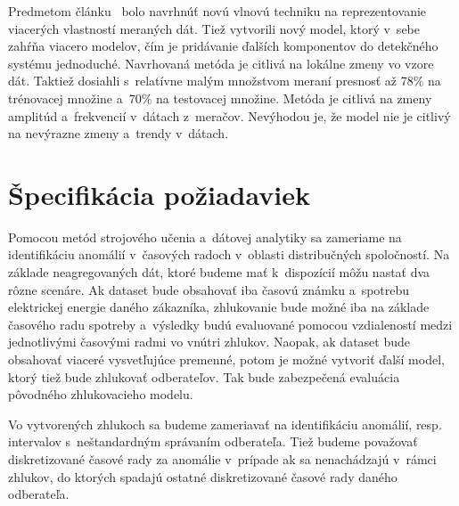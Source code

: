 \documentclass[a4paper,twoside,slovak,12pt,appendix]{article}
\begin{document}
Predmetom článku~\cite{Tagaris2002} bolo navrhnúť novú vlnovú techniku na
reprezentovanie viacerých vlastností meraných dát. Tiež vytvorili nový model,
ktorý v~sebe zahŕňa viacero modelov, čím je pridávanie ďalších komponentov do
detekčného systému jednoduché. Navrhovaná metóda je citlivá na lokálne zmeny vo
vzore dát. Taktiež dosiahli s~relatívne malým množstvom meraní presnosť až 78\%
na trénovacej množine a~70\% na testovacej množine. Metóda je citlivá na zmeny
amplitúd a~frekvencií v~dátach z~meračov. Nevýhodou je, že model nie je citlivý
na nevýrazne zmeny a~trendy v~dátach.\\


\newpage
\section{Špecifikácia požiadaviek}
Pomocou metód strojového učenia a~dátovej analytiky sa zameriame na
identifikáciu anomálií v~časových radoch v~oblasti distribučných spoločností. Na
základe neagregovaných dát, ktoré budeme mať k~dispozícií môžu nastať dva rôzne
scenáre. Ak dataset bude obsahovať iba časovú známku a~spotrebu elektrickej
energie daného zákazníka, zhlukovanie bude možné iba na základe časového radu
spotreby a~výsledky budú evaluované pomocou vzdialeností medzi jednotlivými
časovými radmi vo vnútri zhlukov. Naopak, ak dataset bude obsahovať viaceré
vysvetľujúce premenné, potom je možné vytvoriť ďalší model, ktorý tiež bude
zhlukovať odberateľov. Tak bude zabezpečená evaluácia pôvodného zhlukovacieho
modelu.

Vo vytvorených zhlukoch sa budeme zameriavať na identifikáciu anomálií, resp.
intervalov s~neštandardným správaním odberateľa. Tiež budeme považovať
diskretizované časové rady za anomálie v~prípade ak sa nenachádzajú v~rámci
zhlukov, do ktorých spadajú ostatné diskretizované časové rady daného
odberateľa.


\newpage



\end{document}
